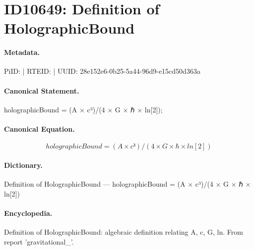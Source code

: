\section*{ID10649: Definition of HolographicBound}
\paragraph{Metadata.}
PiID:  | RTEID:  | UUID: 28e152e6-0b25-5a44-96d9-e15cd50d363a

\paragraph{Canonical Statement.}
holographicBound = (A × c³)/(4 × G × ℏ × ln[2]);

\paragraph{Canonical Equation.}
\[
holographicBound = (A × c³)/(4 × G × ℏ × ln[2])
\]

\paragraph{Dictionary.}
Definition of HolographicBound — holographicBound = (A × c³)/(4 × G × ℏ × ln[2])

\paragraph{Encyclopedia.}
Definition of HolographicBound: algebraic definition relating A, c, G, ln. From report 'gravitational\_'.
